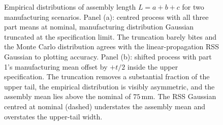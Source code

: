 \begin{figure}[ht]
\caption[Tolerance stack: linear vs Monte Carlo under truncation]{
Empirical distributions of assembly length $L = a + b + c$ for two
manufacturing scenarios. Panel (a): centred process with all three
part means at nominal, manufacturing distribution Gaussian truncated
at the specification limit. The truncation barely bites and the
Monte Carlo distribution agrees with the linear-propagation RSS
Gaussian to plotting accuracy. Panel (b): shifted process with part
1's manufacturing mean offset by $+t/2$ inside the upper
specification. The truncation removes a substantial fraction of
the upper tail, the empirical distribution is visibly asymmetric,
and the assembly mean lies above the nominal of $75\,\si{\milli
\meter}$. The RSS Gaussian centred at nominal (dashed) understates
the assembly mean and overstates the upper-tail width.}
\label{fig:vol01:ch04:tolerance-stack}
\end{figure}
